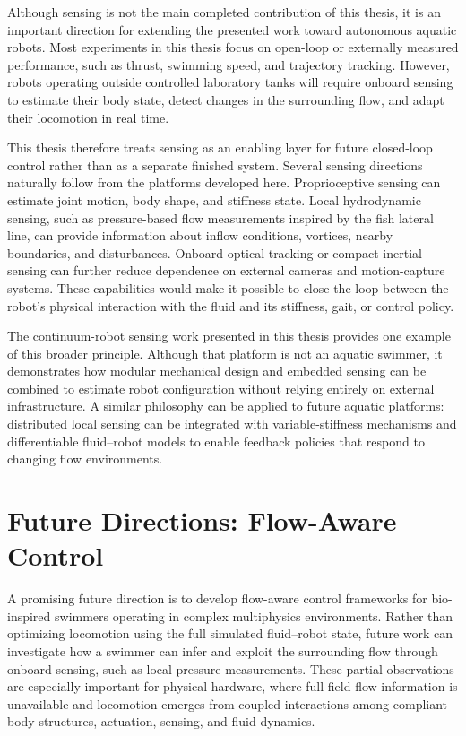 Although sensing is not the main completed contribution of this thesis, it is an important direction for extending the presented work toward autonomous aquatic robots. Most experiments in this thesis focus on open-loop or externally measured performance, such as thrust, swimming speed, and trajectory tracking. However, robots operating outside controlled laboratory tanks will require onboard sensing to estimate their body state, detect changes in the surrounding flow, and adapt their locomotion in real time.

This thesis therefore treats sensing as an enabling layer for future closed-loop control rather than as a separate finished system. Several sensing directions naturally follow from the platforms developed here. Proprioceptive sensing can estimate joint motion, body shape, and stiffness state. Local hydrodynamic sensing, such as pressure-based flow measurements inspired by the fish lateral line, can provide information about inflow conditions, vortices, nearby boundaries, and disturbances. Onboard optical tracking or compact inertial sensing can further reduce dependence on external cameras and motion-capture systems. These capabilities would make it possible to close the loop between the robot's physical interaction with the fluid and its stiffness, gait, or control policy.

The continuum-robot sensing work presented in this thesis provides one example of this broader principle. Although that platform is not an aquatic swimmer, it demonstrates how modular mechanical design and embedded sensing can be combined to estimate robot configuration without relying entirely on external infrastructure. A similar philosophy can be applied to future aquatic platforms: distributed local sensing can be integrated with variable-stiffness mechanisms and differentiable fluid--robot models to enable feedback policies that respond to changing flow environments.

\section{Future Directions: Flow-Aware Control}

A promising future direction is to develop flow-aware control frameworks for bio-inspired swimmers operating in complex multiphysics environments. Rather than optimizing locomotion using the full simulated fluid--robot state, future work can investigate how a swimmer can infer and exploit the surrounding flow through onboard sensing, such as local pressure measurements. These partial observations are especially important for physical hardware, where full-field flow information is unavailable and locomotion emerges from coupled interactions among compliant body structures, actuation, sensing, and fluid dynamics.


